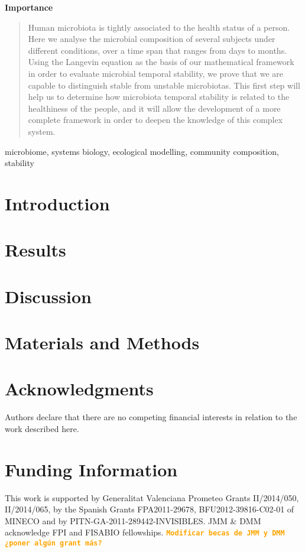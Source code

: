 \documentclass[12pt,oneside,letterpaper]{article}
\newcommand\importancename{Importance}
\newcommand{\importance}[1]{
    \small
    \begin{center}
        {\bfseries \importancename\vspace{-.5em}\vspace{0pt}}
    \end{center}
    \begin{quote}
    #1
    \end{quote}
}
\newcommand{\todo}[1]{\texttt{\bfseries\textcolor{Orange}{#1}}}
\begin{document}
\importance{Human microbiota is tightly associated to the health status of a person. Here we analyse the microbial composition of several subjects under different conditions, over a time span that ranges from days to months. Using the Langevin equation as the basis of our mathematical framework in order to evaluate microbial temporal stability, we prove that we are capable to distinguish stable from unstable microbiotas. This first step will help us to determine how microbiota temporal stability is related to the healthiness of the people, and it will allow the development of a more complete framework in order to deepen the knowledge of this complex system. }

\vspace{4mm}
\begin{keywords}
microbiome, systems biology, ecological modelling, community composition, stability	
\end{keywords}

\section*{Introduction}
   
\section*{Results}

\section*{Discussion}
    
\section*{Materials and Methods}
   


\section*{Acknowledgments}
Authors declare that there are no competing financial interests in relation to the work described here. 

\section*{Funding Information}
This work is supported by Generalitat Valenciana Prometeo Grants II/2014/050, II/2014/065, by the Spanish Grants FPA2011-29678, BFU2012-39816-C02-01 of MINECO and by PITN-GA-2011-289442-INVISIBLES. JMM \& DMM acknowledge FPI and FISABIO fellowships. \todo{Modificar becas de JMM y DMM ¿poner algún grant más?}
\end{document}
